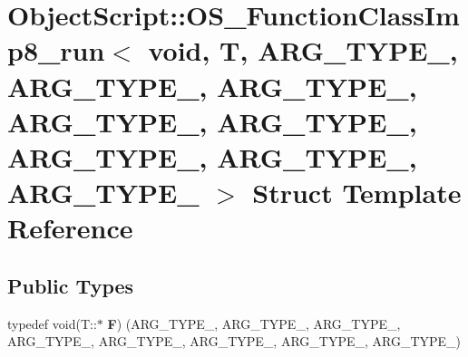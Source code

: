 \hypertarget{struct_object_script_1_1_o_s___function_class_imp8__run_3_01void_00_01_t_00_01_01_01_a_r_g___t_yb85b6ee4d7bc79b1c9283f88811a7efc}{}\section{Object\+Script\+:\+:O\+S\+\_\+\+Function\+Class\+Imp8\+\_\+run$<$ void, T, A\+R\+G\+\_\+\+T\+Y\+P\+E\+\_, A\+R\+G\+\_\+\+T\+Y\+P\+E\+\_, A\+R\+G\+\_\+\+T\+Y\+P\+E\+\_, A\+R\+G\+\_\+\+T\+Y\+P\+E\+\_, A\+R\+G\+\_\+\+T\+Y\+P\+E\+\_, A\+R\+G\+\_\+\+T\+Y\+P\+E\+\_, A\+R\+G\+\_\+\+T\+Y\+P\+E\+\_, A\+R\+G\+\_\+\+T\+Y\+P\+E\+\_ $>$ Struct Template Reference}
\label{struct_object_script_1_1_o_s___function_class_imp8__run_3_01void_00_01_t_00_01_01_01_a_r_g___t_yb85b6ee4d7bc79b1c9283f88811a7efc}
\subsection*{Public Types}
\begin{DoxyCompactItemize}
\item 
typedef void(T\+::$\ast$ {\bfseries F}) (A\+R\+G\+\_\+\+T\+Y\+P\+E\+\_, A\+R\+G\+\_\+\+T\+Y\+P\+E\+\_, A\+R\+G\+\_\+\+T\+Y\+P\+E\+\_, A\+R\+G\+\_\+\+T\+Y\+P\+E\+\_, A\+R\+G\+\_\+\+T\+Y\+P\+E\+\_, A\+R\+G\+\_\+\+T\+Y\+P\+E\+\_, A\+R\+G\+\_\+\+T\+Y\+P\+E\+\_, A\+R\+G\+\_\+\+T\+Y\+P\+E\+\_)\hypertarget{struct_object_script_1_1_o_s___function_class_imp8__run_3_01void_00_01_t_00_01_01_01_a_r_g___t_yb85b6ee4d7bc79b1c9283f88811a7efc_a0dbb8c8bafd1b8a26223f8348db76826}{}\label{struct_object_script_1_1_o_s___function_class_imp8__run_3_01void_00_01_t_00_01_01_01_a_r_g___t_yb85b6ee4d7bc79b1c9283f88811a7efc_a0dbb8c8bafd1b8a26223f8348db76826}

\end{DoxyCompactItemize}
